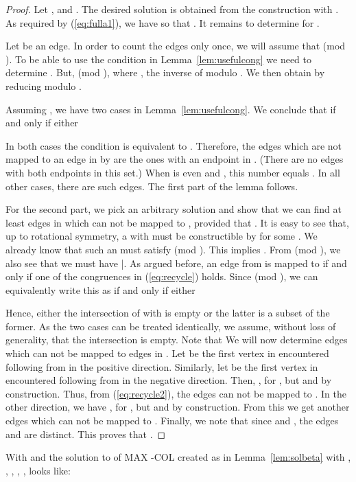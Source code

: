 \documentclass[11pt,a4paper]{article}
\begin{document}
\begin{proof}
Let , and .
The desired solution  is obtained from the construction 
with .
As required by (\ref{eq:fulla1}), we have  so that
.
It remains to determine  for .

Let  be an edge.
In order to count the edges only once, we will assume that  (mod ). To be able to use the condition in Lemma~\ref{lem:usefulcong} we need to
determine .
But,  (mod ), where
, the inverse of  modulo .
We then obtain  by reducing  modulo .

Assuming , we have two cases in Lemma~\ref{lem:usefulcong}.
We conclude that 
 if and only if
either 

In both cases the condition is equivalent to .
Therefore, the edges  which are not mapped to an edge in  by  are the ones with an endpoint in . (There are no edges with both endpoints in this set.) 
When  is even and , this number equals .
In all other cases, there are  such edges.
The first part of the lemma follows.

For the second part, we pick an arbitrary solution  and show that we can
find at least  edges in  which can not be mapped to ,
provided that .
It is easy to see that, up to rotational symmetry, a  with  
must be constructible by  for some . 
We already know that such an  must satisfy  (mod ).
This implies .
From  (mod ), we also see that we must have
|.
As argued before, an edge from  is mapped to  if and only if one of the
congruences in (\ref{eq:recycle}) holds.
Since  (mod ), we can equivalently write this as
 if and only if
either 

Hence, either the intersection of  with  is empty or
the latter is a subset of the former.
As the two cases can be treated identically, we assume, 
without loss of generality, that the intersection is empty.
Note that 
We will now determine  edges which can not be mapped to edges
in .
Let  be the first vertex in  encountered following  from  in
the positive direction.
Similarly, let  be the first vertex in  encountered following  
from  in the negative direction.
Then, ,
for ,
but  and  by construction.
Thus, from (\ref{eq:recycle2}), the edges  
can not be mapped to .
In the other direction, we have ,
for ,
but  and  by construction.
From this we get another  edges which can not be mapped to .
Finally, we note that since  and
, the edges
 and
 are distinct.
This proves that .
\end{proof}


\begin{exmp}
With  and  the solution  to of MAX -COL created as in Lemma~\ref{lem:solbeta} with , , , , ,  looks like:

\end{exmp}
\end{document}
